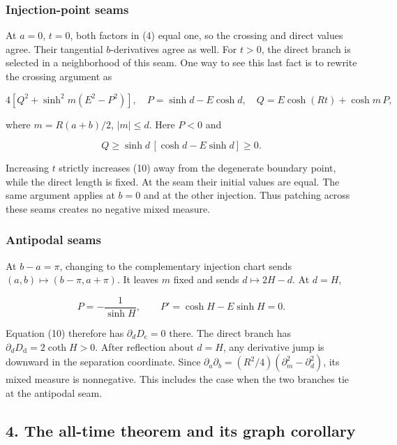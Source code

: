 \documentclass[11pt]{article}
\begin{document}
\subsubsection{Injection-point seams}\label{injection-point-seams}

At \(a=0\), \(t=0\), both factors in (4) equal one, so the crossing and
direct values agree. Their tangential \(b\)-derivatives agree as well.
For \(t>0\), the direct branch is selected in a neighborhood of this
seam. One way to see this last fact is to rewrite the crossing argument
as

\[
4\left[Q^2+\sinh^2m(E^2-P^2)\right],\quad
P=\sinh d-E\cosh d,\quad Q=E\cosh(Rt)+\cosh m\,P,
\tag{10}
\]

where \(m=R(a+b)/2\), \(|m|\le d\). Here \(P<0\) and

\[
Q\ge \sinh d\,[\cosh d-E\sinh d]\ge0.
\]

Increasing \(t\) strictly increases (10) away from the degenerate
boundary point, while the direct length is fixed. At the seam their
initial values are equal. The same argument applies at \(b=0\) and at
the other injection. Thus patching across these seams creates no
negative mixed measure.

\subsubsection{Antipodal seams}\label{antipodal-seams}

At \(b-a=\pi\), changing to the complementary injection chart sends
\((a,b)\mapsto(b-\pi,a+\pi)\). It leaves \(m\) fixed and sends
\(d\mapsto2H-d\). At \(d=H\),

\[
P=-\frac1{\sinh H},\qquad P'=\cosh H-E\sinh H=0.
\]

Equation (10) therefore has \(\partial_dD_{\mathrm c}=0\) there. The
direct branch has \(\partial_dD_{\mathrm d}=2\coth H>0\). After
reflection about \(d=H\), any derivative jump is downward in the
separation coordinate. Since
\(\partial_a\partial_b=(R^2/4)(\partial_m^2-\partial_d^2)\), its mixed
measure is nonnegative. This includes the case when the two branches tie
at the antipodal seam.

\subsection{4. The all-time theorem and its graph
corollary}\label{the-all-time-theorem-and-its-graph-corollary}
\end{document}
